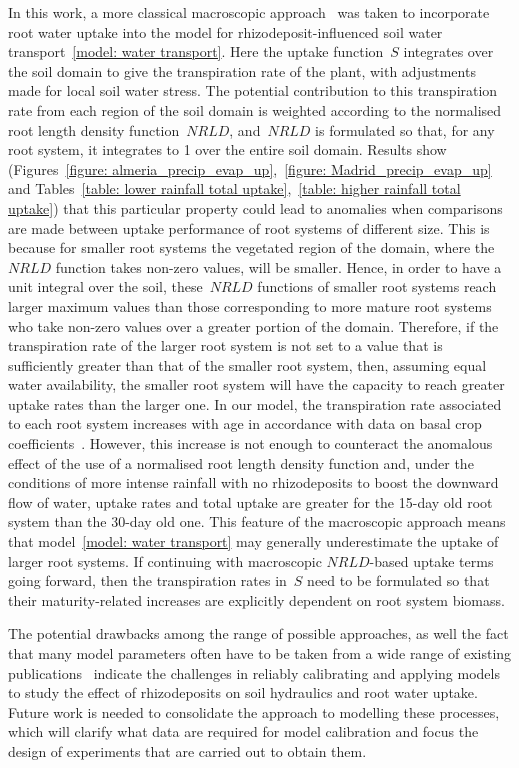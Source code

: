 \documentclass[11pt,a4paper]{article}
\numberwithin{equation}{section}
\begin{document}
In this work, a more classical macroscopic approach~\citep{vsimuunek2009modeling} was taken to incorporate root water uptake into the model for rhizodeposit-influenced soil water transport~\eqref{model: water transport}. Here the uptake function~$S$ integrates over the soil domain to give the transpiration rate of the plant, with adjustments made for local soil water stress. The potential contribution to this transpiration rate from each region of the soil domain is weighted according to the normalised root length density function~$NRLD$, and~$NRLD$ is formulated so that, for any root system, it integrates to 1 over the entire soil domain. Results show (Figures~\ref{figure: almeria_precip_evap_up},~\ref{figure: Madrid_precip_evap_up} and Tables~\ref{table: lower rainfall total uptake},~\ref{table: higher rainfall total uptake}) that this particular property could lead to anomalies when comparisons are made between uptake performance of root systems of different size. This is because for smaller root systems the vegetated region of the domain, where the~$NRLD$ function takes non-zero values, will be smaller. Hence, in order to have a unit integral over the soil, these~$NRLD$ functions of smaller root systems reach larger maximum values than those corresponding to more mature root systems who take non-zero values over a greater portion of the domain. Therefore, if the transpiration rate of the larger root system is not set to a value that is sufficiently greater than that of the smaller root system, then, assuming equal water availability, the smaller root system will have the capacity to reach greater uptake rates than the larger one. In our model, the transpiration rate associated to each root system increases with age in accordance with data on basal crop coefficients~\citep{allen1998crop}. However, this increase is not enough to counteract the anomalous effect of the use of a normalised root length density function and, under the conditions of more intense rainfall with no rhizodeposits to boost the downward flow of water, uptake rates and total uptake are greater for the 15-day old root system than the 30-day old one. This feature of the macroscopic approach means that model~\eqref{model: water transport} may generally underestimate the uptake of larger root systems. If continuing with macroscopic $NRLD$-based uptake terms going forward, then the transpiration rates in~$S$ need to be formulated so that their maturity-related increases are explicitly dependent on root system biomass. 


The potential drawbacks among the range of possible approaches, as well the fact that many model parameters often have to be taken from a wide range of existing publications~\citep{landl2021modeling, mair2023can, mair2022model} indicate the challenges in reliably calibrating and applying models to study the effect of rhizodeposits on soil hydraulics and root water uptake. Future work is needed to consolidate the approach to modelling these processes, which will clarify what data are required for model calibration and focus the design of experiments that are carried out to obtain them.
\end{document}
